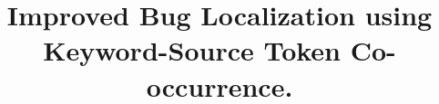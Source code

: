 \documentclass{sig-alternate}
\begin{document}
%
\title{ 
Improved Bug Localization using Keyword-Source Token Co-occurrence.
}
%
%
%
%
%
\end{document}
